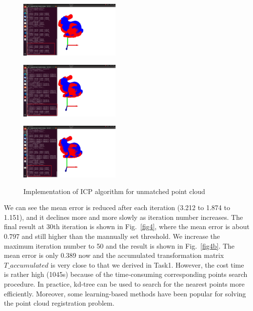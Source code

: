 \documentclass[hyperref]{article}
\theoremstyle{nonumberplain}
\begin{document}
\begin{figure}[H]
	\centering
	\begin{minipage}[t]{0.32\textwidth}
		\centering
		\includegraphics[width=5cm]{2_M1.png}
		\label{fig3a}
	\end{minipage}
	\begin{minipage}[t]{0.32\textwidth}
		\centering
		\includegraphics[width=5cm]{2_M2.png}
		\label{fig3b}
	\end{minipage}
	\begin{minipage}[t]{0.32\textwidth}
		\centering
		\includegraphics[width=5cm]{2_M3.png}
		\label{fig3c}
	\end{minipage}
	\caption{Implementation of ICP algorithm for unmatched point cloud}
	\label{fig3}
\end{figure} 

We can see the mean error is reduced after each iteration (3.212 to 1.874 to 1.151), and it declines more and more slowly as iteration number increases. The final result at 30th iteration is shown in Fig.~\ref{fig4}, where the mean error is about 0.797 and still higher than the mannually set threshold. We increase the maximum iteration number to 50 and the result is shown in Fig.~\ref{fig4b}. The mean error is only 0.389 now and the accumulated transformation matrix $T\_accumulated$ is very close to that we derived in Task1. However, the cost time is rather high (1045s) because of the time-consuming corresponding points search procedure. In practice, kd-tree can be used to search for the nearest points more efficiently. Moreover, some learning-based methods have been popular for solving the point cloud registration problem. 
\end{document}
